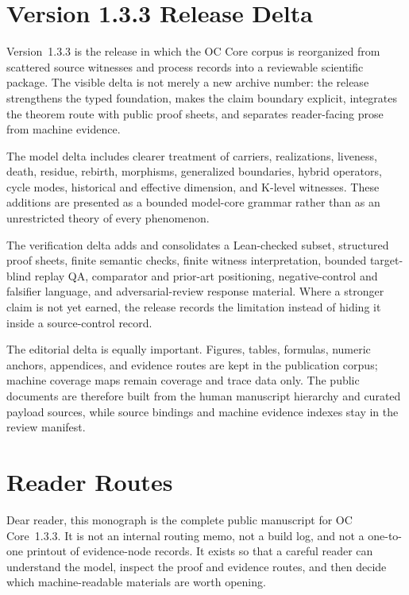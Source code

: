 \clearpage
\section*{Version 1.3.3 Release Delta}
Version~1.3.3 is the release in which the OC Core corpus is reorganized from
scattered source witnesses and process records into a reviewable scientific
package. The visible delta is not merely a new archive number: the release
strengthens the typed foundation, makes the claim boundary explicit, integrates
the theorem route with public proof sheets, and separates reader-facing prose
from machine evidence.

The model delta includes clearer treatment of carriers, realizations, liveness,
death, residue, rebirth, morphisms, generalized boundaries, hybrid operators,
cycle modes, historical and effective dimension, and K-level witnesses. These
additions are presented as a bounded model-core grammar rather than as an
unrestricted theory of every phenomenon.

The verification delta adds and consolidates a Lean-checked subset, structured
proof sheets, finite semantic checks, finite witness interpretation, bounded
target-blind replay QA, comparator and prior-art positioning, negative-control
and falsifier language, and adversarial-review response material. Where a
stronger claim is not yet earned, the release records the limitation instead of
hiding it inside a source-control record.

The editorial delta is equally important. Figures, tables, formulas, numeric
anchors, appendices, and evidence routes are kept in the publication corpus;
machine coverage maps remain coverage and trace data only. The public
documents are therefore built from the human manuscript hierarchy and curated
payload sources, while source bindings and machine evidence indexes stay in the
review manifest.

\clearpage
\section*{Reader Routes}
Dear reader, this monograph is the complete public manuscript for OC
Core~1.3.3. It is not an internal routing memo, not a build log, and not a
one-to-one printout of evidence-node records. It exists so that a careful
reader can understand the model, inspect the proof and evidence routes, and
then decide which machine-readable materials are worth opening.

